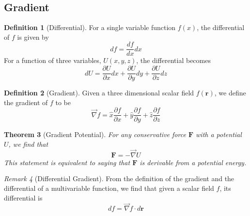 \documentclass[12pt]{article}
\newtheorem{thm}{Theorem}[section]
\theoremstyle{definition}
\newtheorem{defn}[thm]{Definition}
\theoremstyle{remark}
\newtheorem{rmk}[thm]{Remark}
\numberwithin{equation}{section}
\newcommand\B[1]{\textbf{#1}}
\begin{document}
\subsection{Gradient}

\begin{defn}[Differential]
        For a single variable function $f(x)$, the differential of $f$ is given by \begin{equation}
                df = \frac{df}{dx}dx
        \end{equation}
        For a function of three variables, $U(x,y,z)$, the differential becomes \begin{equation}
                dU = \frac{\partial U}{\partial x}dx +  \frac{\partial U}{\partial y}dy +  \frac{\partial U}{\partial z}dz
        \end{equation}
\end{defn}


\vspace{15pt}

\begin{defn}[Gradient]
        Given a three dimensional scalar field $f(\B{r})$, we define the gradient of $f$ to be \begin{equation}
                \vec{\nabla} f = \hat{x} \frac{\partial f}{\partial x} + \hat{y} \frac{\partial f}{\partial y} + \hat{z}  \frac{\partial f}{\partial z}
        \end{equation}
\end{defn}


\vspace{15pt}

\begin{thm}[Gradient Potential]
        For any conservative force $\B{F}$ with a potential $U$, we find that \begin{equation}
                \B{F} = -\vec{\nabla} U
        \end{equation}
        This statement is equivalent to saying that $\B{F}$ is derivable from a potential energy.
\end{thm}

\vspace{15pt}

\begin{rmk}[Differential Gradient]
        From the definition of the gradient and the differential of a multivariable function, we find that given a scalar field $f$, its differential is \begin{equation}
                df = \vec{\nabla}f\cdot d\B{r}
        \end{equation}
\end{rmk}
\end{document}
